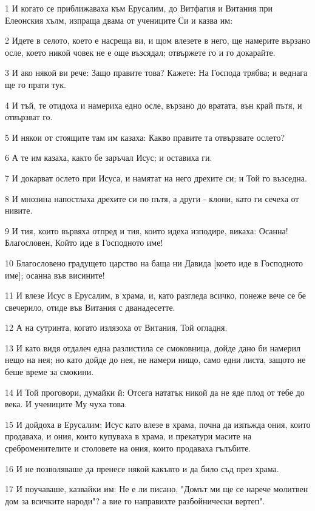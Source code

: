 \par 1 И когато се приближаваха към Ерусалим, до Витфагия и Витания при Елеонския хълм, изпраща двама от учениците Си и казва им:
\par 2 Идете в селото, което е насреща ви, и щом влезете в него, ще намерите вързано осле, което никой човек не е още възсядал; отвържете го и го докарайте.
\par 3 И ако някой ви рече: Защо правите това? Кажете: На Господа трябва; и веднага ще го прати тук.
\par 4 И тъй, те отидоха и намериха едно осле, вързано до вратата, вън край пътя, и отвързват го.
\par 5 И някои от стоящите там им казаха: Какво правите та отвързвате ослето?
\par 6 А те им казаха, както бе заръчал Исус; и оставиха ги.
\par 7 И докарват ослето при Исуса, и намятат на него дрехите си; и Той го възседна.
\par 8 И мнозина напостлаха дрехите си по пътя, а други - клони, като ги сечеха от нивите.
\par 9 И тия, които вървяха отпред и тия, които идеха изподире, викаха: Осанна! Благословен, Който иде в Господното име!
\par 10 Благословено градущето царство на баща ни Давида [което иде в Господното име]; осанна във висините!
\par 11 И влезе Исус в Ерусалим, в храма, и, като разгледа всичко, понеже вече се бе свечерило, отиде във Витания с дванадесетте.
\par 12 А на сутринта, когато излязоха от Витания, Той огладня.
\par 13 И като видя отдалеч една разлистила се смоковница, дойде дано би намерил нещо на нея; но като дойде до нея, не намери нищо, само едни листа, защото не беше време за смокини.
\par 14 И Той проговори, думайки й: Отсега нататък никой да не яде плод от тебе до века. И учениците Му чуха това.
\par 15 И дойдоха в Ерусалим; Исус като влезе в храма, почна да изпъжда ония, които продаваха, и ония, които купуваха в храма, и прекатури масите на среброменителите и столовете на ония, които продаваха гълъбите.
\par 16 И не позволяваше да пренесе някой какъвто и да било съд през храма.
\par 17 И поучаваше, казвайки им: Не е ли писано, "Домът ми ще се нарече молитвен дом за всичките народи"? а вие го направихте разбойнически вертеп".
